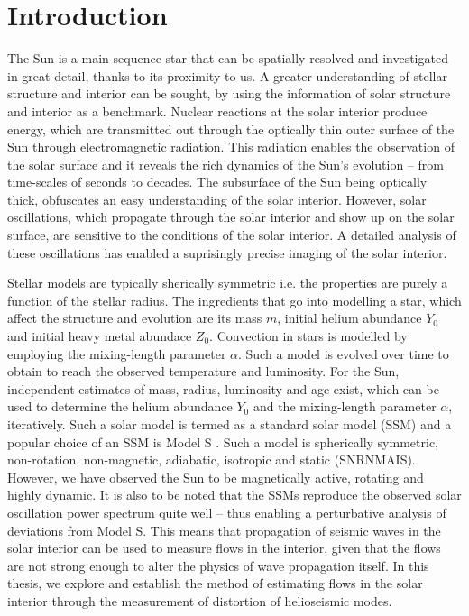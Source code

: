 \chapter{Introduction}
\label{chap:00-introduction}

The Sun is a main-sequence star that can be spatially resolved
and investigated in great detail, thanks to its
proximity to us. A greater understanding of stellar structure
and interior can be sought, by using the information of 
solar structure and interior as a benchmark. Nuclear reactions
at the solar interior produce energy, which are transmitted 
out through the optically thin outer surface of the Sun 
through electromagnetic radiation. This radiation enables 
the observation of the solar surface and it reveals the rich
dynamics of the Sun's evolution -- from time-scales of seconds
to decades. The subsurface of the Sun being optically thick, 
obfuscates an easy understanding of the solar interior. However, 
solar oscillations, which propagate through the solar interior
and show up on the solar surface, are sensitive to the conditions 
of the solar interior. A detailed analysis of these oscillations
has enabled a suprisingly precise imaging of the solar interior. 

Stellar models are typically sherically symmetric i.e. the 
properties are purely a function of the stellar radius.
The ingredients that go into modelling a star, which 
affect the structure and evolution are 
its mass $m$, initial helium abundance $Y_0$ and initial
heavy metal abundace $Z_0$. Convection in stars is modelled 
by employing the mixing-length parameter $\alpha$. Such a 
model is evolved over time to obtain to reach the observed
temperature and luminosity. For the Sun, independent 
estimates of mass, radius, luminosity and age exist, which 
can be used to determine the helium abundance $Y_0$ and 
the mixing-length parameter $\alpha$, iteratively. Such a 
solar model is termed as a standard solar model (SSM) and
a popular choice of an SSM is Model S \citep{JCD-1996-Science}.
Such a model is spherically symmetric, non-rotation, non-magnetic,
adiabatic, isotropic and static (SNRNMAIS). 
However, we have observed the Sun to be magnetically active, rotating and highly 
dynamic. It is also to be noted that the SSMs reproduce the 
observed solar oscillation power spectrum quite well --
thus enabling a perturbative analysis of deviations from Model S. 
This means that propagation of seismic waves in the solar interior
can be used to measure flows in the interior, given that the 
flows are not strong enough to alter the physics of wave propagation
itself. In this thesis, we explore and establish the method of 
estimating flows in the solar interior through the measurement of
distortion of helioseismic modes.


